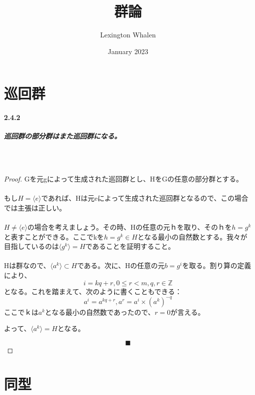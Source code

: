 \documentclass{article}
\title{群論}
\author{Lexington Whalen}
\date{January 2023}
\begin{document}
\begin{CJK}{UTF8}{min}

\maketitle

\section{巡回群}

\begin{question}
\paragraph{2.4.2}
\textit{
\textbf{巡回群の部分群はまた巡回群になる。}
}
\end{question}
\\\\
\begin{proof}
Gを元gによって生成された巡回群とし、HをGの任意の部分群とする。\\\\
もし$H = \langle e \rangle$であれば、Hは元eによって生成された巡回群となるので、この場合では主張は正しい。\\\\
$H \neq \langle e \rangle$の場合を考えましょう。その時、Hの任意の元ｈを取り、そのｈを$h = g^{k}$と表すことができる。ここでkを$h = g^{k} \in H$となる最小の自然数とする。我々が目指しているのは$\langle g^{k} \rangle = H$であることを証明すること。\\\\

Hは群なので、$\langle a^{k} \rangle \subset H$である。次に、Hの任意の元$b = g^{i}$を取る。割り算の定義により、\\
$$ i = kq + r,  0 \leq r < m, q,r \in \mathbb{Z} $$
となる。これを踏まえて、次のように書くこともできる：\\
$$ a^{i} = a^{kq+r}, a^{r} = a^{i} \times (a^{k})^{-q} $$
ここでｋは$a^{k}$となる最小の自然数であったので、$r=0$が言える。

よって、$\langle a^{k} \rangle = H$となる。

$$\mdblksquare$$

\end{proof}

\section{同型}
\begin{question}

\end{question}
\end{CJK}
\end{document}
